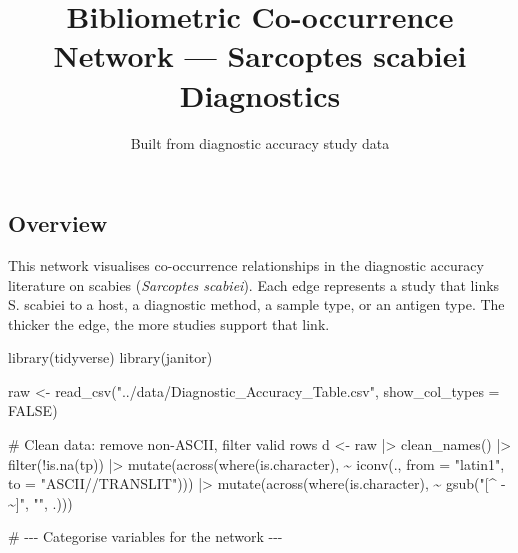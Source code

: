 \documentclass[
  letterpaper,
  DIV=11,
  numbers=noendperiod]{scrartcl}
\title{Bibliometric Co-occurrence Network --- Sarcoptes scabiei
Diagnostics}
\subtitle{Built from diagnostic accuracy study data}
\author{}
\date{}
\newenvironment{Shaded}{\begin{snugshade}}{\end{snugshade}}
\newcommand{\AttributeTok}[1]{\textcolor[rgb]{0.40,0.45,0.13}{#1}}
\newcommand{\CommentTok}[1]{\textcolor[rgb]{0.37,0.37,0.37}{#1}}
\newcommand{\ConstantTok}[1]{\textcolor[rgb]{0.56,0.35,0.01}{#1}}
\newcommand{\FunctionTok}[1]{\textcolor[rgb]{0.28,0.35,0.67}{#1}}
\newcommand{\NormalTok}[1]{\textcolor[rgb]{0.00,0.23,0.31}{#1}}
\newcommand{\OtherTok}[1]{\textcolor[rgb]{0.00,0.23,0.31}{#1}}
\newcommand{\SpecialCharTok}[1]{\textcolor[rgb]{0.37,0.37,0.37}{#1}}
\newcommand{\StringTok}[1]{\textcolor[rgb]{0.13,0.47,0.30}{#1}}
\begin{document}
\maketitle


\subsection{Overview}\label{overview}

This network visualises co-occurrence relationships in the diagnostic
accuracy literature on scabies (\emph{Sarcoptes scabiei}). Each edge
represents a study that links S. scabiei to a host, a diagnostic method,
a sample type, or an antigen type. The thicker the edge, the more
studies support that link.

\begin{Shaded}
\begin{Highlighting}[]
\FunctionTok{library}\NormalTok{(tidyverse)}
\FunctionTok{library}\NormalTok{(janitor)}

\NormalTok{raw }\OtherTok{\textless{}{-}} \FunctionTok{read\_csv}\NormalTok{(}\StringTok{"../data/Diagnostic\_Accuracy\_Table.csv"}\NormalTok{, }\AttributeTok{show\_col\_types =} \ConstantTok{FALSE}\NormalTok{)}

\CommentTok{\# Clean data: remove non{-}ASCII, filter valid rows}
\NormalTok{d }\OtherTok{\textless{}{-}}\NormalTok{ raw }\SpecialCharTok{|\textgreater{}}
  \FunctionTok{clean\_names}\NormalTok{() }\SpecialCharTok{|\textgreater{}}
  \FunctionTok{filter}\NormalTok{(}\SpecialCharTok{!}\FunctionTok{is.na}\NormalTok{(tp)) }\SpecialCharTok{|\textgreater{}}
  \FunctionTok{mutate}\NormalTok{(}\FunctionTok{across}\NormalTok{(}\FunctionTok{where}\NormalTok{(is.character), }\SpecialCharTok{\textasciitilde{}} \FunctionTok{iconv}\NormalTok{(., }\AttributeTok{from =} \StringTok{"latin1"}\NormalTok{, }\AttributeTok{to =} \StringTok{"ASCII//TRANSLIT"}\NormalTok{))) }\SpecialCharTok{|\textgreater{}}
  \FunctionTok{mutate}\NormalTok{(}\FunctionTok{across}\NormalTok{(}\FunctionTok{where}\NormalTok{(is.character), }\SpecialCharTok{\textasciitilde{}} \FunctionTok{gsub}\NormalTok{(}\StringTok{"[\^{} {-}\textasciitilde{}]"}\NormalTok{, }\StringTok{""}\NormalTok{, .)))}

\CommentTok{\# {-}{-}{-} Categorise variables for the network {-}{-}{-}}


\end{Highlighting}
\end{Shaded}
\end{document}
